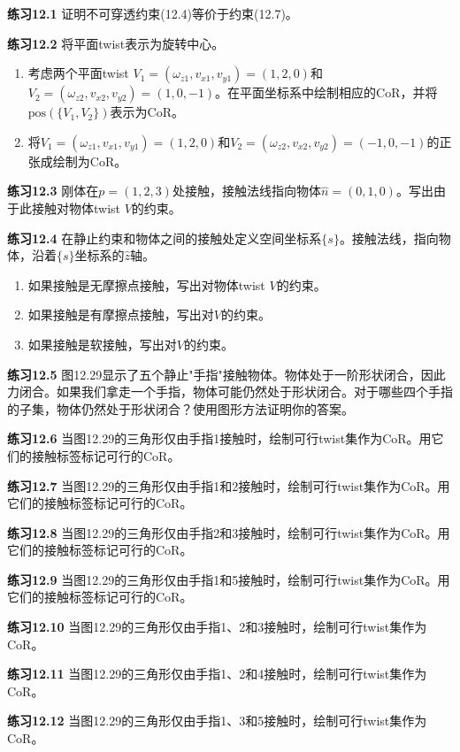 \documentclass[12pt,a4paper]{article}
\begin{document}
\textbf{练习12.1} 证明不可穿透约束(12.4)等价于约束(12.7)。

\textbf{练习12.2} 将平面twist表示为旋转中心。
\begin{enumerate}
\item[(a)] 考虑两个平面twist $V_1 = (\omega_{z1}, v_{x1}, v_{y1}) = (1, 2, 0)$和$V_2 = (\omega_{z2}, v_{x2}, v_{y2}) = (1, 0, -1)$。在平面坐标系中绘制相应的CoR，并将$\text{pos}(\{V_1, V_2\})$表示为CoR。
\item[(b)] 将$V_1 = (\omega_{z1}, v_{x1}, v_{y1}) = (1, 2, 0)$和$V_2 = (\omega_{z2}, v_{x2}, v_{y2}) = (-1, 0, -1)$的正张成绘制为CoR。
\end{enumerate}

\textbf{练习12.3} 刚体在$p = (1, 2, 3)$处接触，接触法线指向物体$\hat{n} = (0, 1, 0)$。写出由于此接触对物体twist $V$的约束。

\textbf{练习12.4} 在静止约束和物体之间的接触处定义空间坐标系$\{s\}$。接触法线，指向物体，沿着$\{s\}$坐标系的$\hat{z}$轴。
\begin{enumerate}
\item[(a)] 如果接触是无摩擦点接触，写出对物体twist $V$的约束。
\item[(b)] 如果接触是有摩擦点接触，写出对$V$的约束。
\item[(c)] 如果接触是软接触，写出对$V$的约束。
\end{enumerate}

\textbf{练习12.5} 图12.29显示了五个静止"手指"接触物体。物体处于一阶形状闭合，因此力闭合。如果我们拿走一个手指，物体可能仍然处于形状闭合。对于哪些四个手指的子集，物体仍然处于形状闭合？使用图形方法证明你的答案。

\textbf{练习12.6} 当图12.29的三角形仅由手指1接触时，绘制可行twist集作为CoR。用它们的接触标签标记可行的CoR。

\textbf{练习12.7} 当图12.29的三角形仅由手指1和2接触时，绘制可行twist集作为CoR。用它们的接触标签标记可行的CoR。

\textbf{练习12.8} 当图12.29的三角形仅由手指2和3接触时，绘制可行twist集作为CoR。用它们的接触标签标记可行的CoR。

\textbf{练习12.9} 当图12.29的三角形仅由手指1和5接触时，绘制可行twist集作为CoR。用它们的接触标签标记可行的CoR。

\textbf{练习12.10} 当图12.29的三角形仅由手指1、2和3接触时，绘制可行twist集作为CoR。

\textbf{练习12.11} 当图12.29的三角形仅由手指1、2和4接触时，绘制可行twist集作为CoR。

\textbf{练习12.12} 当图12.29的三角形仅由手指1、3和5接触时，绘制可行twist集作为CoR。
\end{document}
